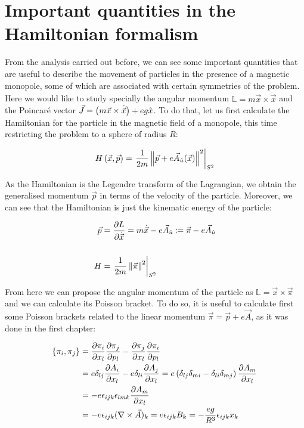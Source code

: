 \section{Important quantities in the Hamiltonian formalism}
From the analysis carried out before, we can see some important quantities that are useful to describe the movement of particles in the presence of a magnetic monopole, some of which are associated with certain symmetries of the problem. Here we would like to study specially the angular momentum $\mathbb{L}= m\vec{x}\times\dot{\vec{x}}$ and the Poincar\'e vector $\vec{J} = \left( m\vec{x}\times\dot{\vec{x}} \right)+ eg\hat{x}$. To do that, let us first calculate the Hamiltonian for the particle in the magnetic field of a monopole, this time restricting the problem to a sphere of radius $R$:

\begin{equation}
H\left( \vec{x},\vec{p} \right) = \left.\frac{1}{2m}\left\lVert \vec{p}+e\vec{A}_{\hat{u}}(\vec{x}) \right\rVert^2\right|_{S^2}
\label{hamiltonian}
\end{equation}

As the Hamiltonian is the Legendre transform of the Lagrangian, we obtain the generalised momentum $\vec{p}$  in terms of the velocity of the particle. Moreover, we can see that the Hamiltonian is just the kinematic energy of the particle:

\begin{equation*}
\begin{aligned}
\vec{p} &= \frac{\partial L}{\partial \dot{\vec{x}}} = m\dot{\vec{x}}-e\vec{A}_{\hat{u}} \coloneqq \vec{\pi}-e\vec{A}_{\hat{u}} \\
\\
H &= \left.\frac{1}{2m}\left\lVert \vec{\pi} \right\rVert^2\right|_{S^2}
\end{aligned}
\end{equation*}

From here we can propose the angular momentum of the particle as $\mathbb{L}= \vec{x}\times\vec{\pi}$ and we can calculate its Poisson bracket. To do so, it is useful to calculate first some Poisson brackets related to the linear momentum $\vec{\pi} = \vec{p} + e\vec{A}$, as it was done in the first chapter:


\begin{align*}
\left\lbrace \pi_i, \pi_j \right\rbrace &= \frac{\partial \pi_i}{\partial x_l}\frac{\partial \pi_j}{\partial p_l} - \frac{\partial \pi_j}{\partial x_l}\frac{\partial \pi_i}{\partial p_l}\\
&= e\delta_{lj}\frac{\partial A_i}{\partial x_l} -e\delta_{li}\frac{\partial A_j}{\partial x_l}            = e\left( \delta_{lj}\delta_{mi} - \delta_{li}\delta_{mj} \right)\frac{\partial A_m}{\partial x_l} \\
&= -e\epsilon_{ijk}\epsilon_{lmk}\frac{\partial A_m}{\partial x_l}\\
&= -e\epsilon_{ijk}(\nabla \times \vec{A})_k = e\epsilon_{ijk}B_k = -\frac{eg}{R^3}\epsilon_{ijk}x_k
\end{align*}

